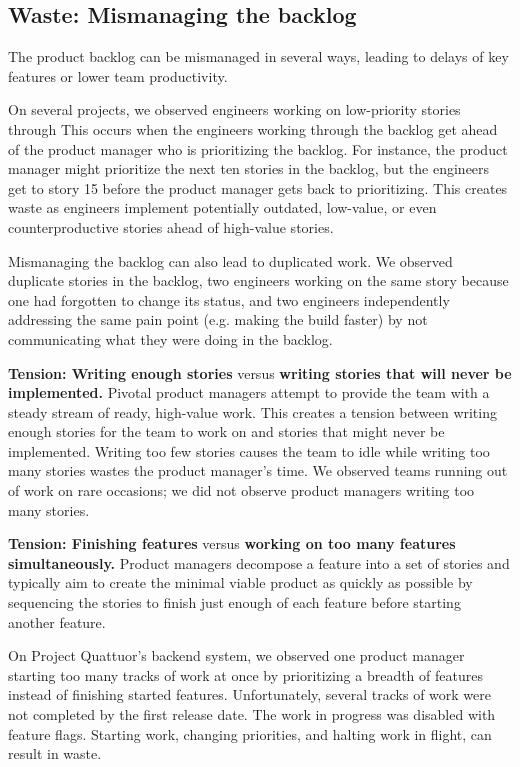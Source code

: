 \subsection{Waste: Mismanaging the backlog}
The product backlog can be mismanaged in several ways, leading to delays of key features or lower team productivity. 

On several projects, we observed engineers working on low-priority stories through  This occurs when the engineers working through the backlog get ahead of the product manager who is prioritizing the backlog. For instance, the product manager might prioritize the next ten stories in the backlog, but the engineers get to story 15 before the product manager gets back to prioritizing. This creates waste as engineers implement potentially outdated, low-value, or even counterproductive stories ahead of high-value stories.   

Mismanaging the backlog can also lead to duplicated work. We observed duplicate stories in the backlog, two engineers working on the same story because one had forgotten to change its status, and two engineers independently addressing the same pain point (e.g. making the build faster) by not communicating what they were doing in the backlog.

\textbf{Tension: Writing enough stories} versus \textbf{writing stories that will never be implemented.}
Pivotal product managers attempt to provide the team with a steady stream of ready, high-value work. This creates a tension between writing enough stories for the team to work on and  stories that might never be implemented. Writing too few stories causes the team to idle while writing too many stories wastes the product manager's time. We observed teams running out of work on rare occasions; we did not observe product managers writing too many stories.  

\textbf{Tension: Finishing features} versus \textbf{working on too many features simultaneously.}
Product managers decompose a feature into a set of stories and typically aim to create the minimal viable product as quickly as possible by sequencing the stories to finish just enough of each feature before starting another feature. 

On Project Quattuor's backend system, we observed one product manager starting too many tracks of work at once by prioritizing a breadth of features instead of finishing started features. Unfortunately, several tracks of work were not completed by the first release date. The work in progress was disabled with feature flags. Starting work, changing priorities, and halting work in flight, can result in waste.

